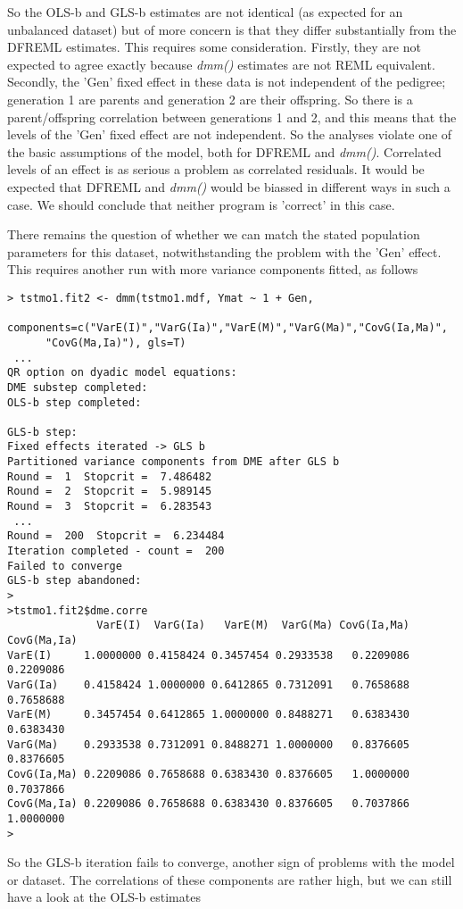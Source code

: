\documentclass[titlepage]{article}  %
\begin{document}
So the OLS-b and GLS-b estimates are not identical (as expected for an unbalanced dataset) but of more concern is that they differ substantially from the DFREML estimates. This requires some consideration. Firstly, they are not expected to agree exactly because {\em dmm()} estimates are not REML equivalent. Secondly, the 'Gen' fixed effect in these data is not independent of the pedigree; generation 1 are parents and generation 2 are their offspring. So there is a parent/offspring correlation between generations 1 and 2, and this means that the levels of the 'Gen' fixed effect are not independent. So the  analyses violate one of the basic assumptions of the model, both for DFREML and {\em dmm()}.  Correlated levels of an effect is as serious a problem as correlated residuals. It would be expected that DFREML and {\em dmm()} would be biassed in different ways in such a case. We should conclude that neither program is 'correct' in this case.
 

There remains the question of whether we can match the stated population parameters for this dataset, notwithstanding the problem with the 'Gen' effect. This requires another run with more variance components fitted, as follows

\begin{verbatim}
> tstmo1.fit2 <- dmm(tstmo1.mdf, Ymat ~ 1 + Gen,
      components=c("VarE(I)","VarG(Ia)","VarE(M)","VarG(Ma)","CovG(Ia,Ma)",
      "CovG(Ma,Ia)"), gls=T)
 ...
QR option on dyadic model equations:
DME substep completed:
OLS-b step completed:

GLS-b step:
Fixed effects iterated -> GLS b
Partitioned variance components from DME after GLS b 
Round =  1  Stopcrit =  7.486482 
Round =  2  Stopcrit =  5.989145 
Round =  3  Stopcrit =  6.283543 
 ...
Round =  200  Stopcrit =  6.234484 
Iteration completed - count =  200 
Failed to converge
GLS-b step abandoned:
>
>tstmo1.fit2$dme.corre
              VarE(I)  VarG(Ia)   VarE(M)  VarG(Ma) CovG(Ia,Ma) CovG(Ma,Ia)
VarE(I)     1.0000000 0.4158424 0.3457454 0.2933538   0.2209086   0.2209086
VarG(Ia)    0.4158424 1.0000000 0.6412865 0.7312091   0.7658688   0.7658688
VarE(M)     0.3457454 0.6412865 1.0000000 0.8488271   0.6383430   0.6383430
VarG(Ma)    0.2933538 0.7312091 0.8488271 1.0000000   0.8376605   0.8376605
CovG(Ia,Ma) 0.2209086 0.7658688 0.6383430 0.8376605   1.0000000   0.7037866
CovG(Ma,Ia) 0.2209086 0.7658688 0.6383430 0.8376605   0.7037866   1.0000000
>
\end{verbatim}

So the GLS-b iteration fails to converge, another sign of problems with the model or dataset. The correlations of these components are rather high, but we can still have a look at the OLS-b estimates
\end{document}
